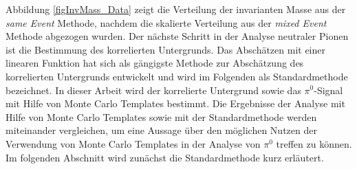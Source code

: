 \newline
Abbildung \ref{figInvMass_Data} zeigt die Verteilung der invarianten Masse aus der \textit{same Event} Methode, nachdem die skalierte Verteilung aus der \textit{mixed Event} Methode abgezogen wurden.
\newline
Der nächste Schritt in der Analyse neutraler Pionen ist die Bestimmung des korrelierten Untergrunds.
Das Abschätzen mit einer linearen Funktion hat sich als gängigste Methode zur Abschätzung des korrelierten Untergrunds entwickelt und wird im Folgenden als Standardmethode bezeichnet.
In dieser Arbeit wird der korrelierte Untergrund sowie das $\pi^{0}$-Signal mit Hilfe von Monte Carlo Templates bestimmt.
Die Ergebnisse der Analyse mit Hilfe von Monte Carlo Templates sowie mit der Standardmethode werden miteinander vergleichen, um eine Aussage über den möglichen Nutzen der Verwendung von Monte Carlo Templates in der Analyse von $\pi^{0}$ treffen zu können.
Im folgenden Abschnitt wird zunächst die Standardmethode kurz erläutert.
